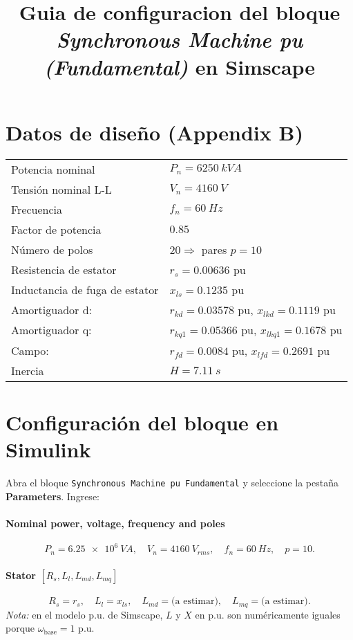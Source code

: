 \documentclass[11pt]{article}
\title{Guia de configuracion del bloque \emph{Synchronous Machine pu (Fundamental)} en Simscape}
\begin{document}
\maketitle

\section{Datos de dise\~no (Appendix B)}
\begin{center}
\begin{tabular}{ll}
\toprule
Potencia nominal & \(P_n=\SI{6250}{kVA}\)\\
Tensi\'on nominal L-L & \(V_n=\SI{4160}{V}\)\\
Frecuencia & \(f_n=\SI{60}{Hz}\)\\
Factor de potencia & \(0.85\)\\
N\'umero de polos & \(20\Rightarrow\) pares \(p=10\)\\
Resistencia de estator & \(r_s=0.00636\) pu\\
Inductancia de fuga de estator & \(x_{ls}=0.1235\) pu\\
Amortiguador d: & \(r_{kd}=0.03578\) pu,\; \(x_{lkd}=0.1119\) pu\\
Amortiguador q: & \(r_{kq1}=0.05366\) pu,\; \(x_{lkq1}=0.1678\) pu\\
Campo: & \(r_{fd}=0.0084\) pu,\; \(x_{lfd}=0.2691\) pu\\
Inercia & \(H=\SI{7.11}{s}\)\\
\bottomrule
\end{tabular}
\end{center}

\section{Configuraci\'on del bloque en Simulink}
Abra el bloque \texttt{Synchronous Machine pu Fundamental} y seleccione la pesta\~na \textbf{Parameters}. Ingrese:

\paragraph{Nominal power, voltage, frequency and poles}
\[
P_n=\SI{6.25e6}{VA},\quad V_n=\SI{4160}{V_{rms}},\quad f_n=\SI{60}{Hz},\quad p=10.
\]

\paragraph{Stator \([R_s, L_l, L_{md}, L_{mq}]\)}
\[
R_s=r_s,\quad L_l=x_{ls},\quad L_{md}=\text{(a estimar)},\quad L_{mq}=\text{(a estimar)}.
\]
\emph{Nota:} en el modelo p.u. de Simscape, \(L\) y \(X\) en p.u. son num\'ericamente iguales porque \(\omega_\text{base}=1\) p.u.
\end{document}
